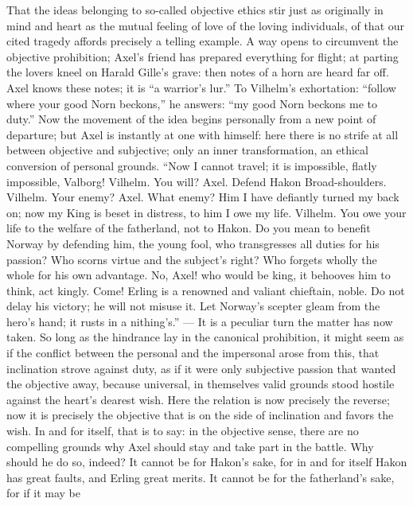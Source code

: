 \documentclass[12pt,a4paper,openany]{book}
\newcommand{\opage}[1]{\marginnote{\footnotesize\textit{[#1]}}}
\begin{document}
That the ideas belonging to so-called objective ethics
stir just as originally in mind and heart as
the mutual feeling of love of the loving individuals, of that
our cited tragedy affords precisely a telling
example. A way opens to circumvent the objective prohibition;
Axel's friend has prepared everything for flight;
at parting the lovers kneel on Harald Gille's grave:
then notes of a horn are heard far off. Axel knows
these notes; it is ``a warrior's lur.'' To Vilhelm's exhortation:
``follow where your good Norn beckons,'' he answers:
``my good Norn beckons me to duty.'' Now the movement of the idea
begins personally from a new point of departure;
\setcounter{footnote}{0}%
\opage{599}but Axel is instantly at one with himself: here there is no
strife at all between objective and subjective; only an
inner transformation, an ethical conversion of personal
grounds. ``Now I cannot travel; it is impossible, flatly
impossible, Valborg! Vilhelm. You will? Axel. Defend
Hakon Broad-shoulders. Vilhelm. Your enemy? Axel.
What enemy? Him I have defiantly turned my back on;
now my King is beset in distress, to him I owe my
life. Vilhelm. You owe your life to the welfare of the fatherland, not to
Hakon. Do you mean to benefit Norway by defending him,
the young fool, who transgresses all duties for his passion?
Who scorns virtue and the subject's right?
Who forgets wholly the whole for his own advantage. No,
Axel! who would be king, it behooves him to think,
act kingly. Come! Erling is a renowned and valiant
chieftain, noble. Do not delay his victory; he will not
misuse it. Let Norway's scepter gleam from the hero's
hand; it rusts in a nithing's.'' --- It is a peculiar
turn the matter has now taken. So long as the hindrance lay in
the canonical prohibition, it might seem as if the conflict
between the personal and the impersonal arose
from this, that inclination strove against duty, as if
it were only subjective passion that wanted the objective
away, because universal, in themselves valid grounds stood hostile
against the heart's dearest wish. Here the relation is now
precisely the reverse; now it is precisely the objective
that is on the side of inclination and favors
the wish. In and for itself, that is to say: in the objective sense, there
are no compelling grounds why Axel should stay and
take part in the battle. Why should he do so, indeed?
It cannot be for Hakon's sake, for in and for itself
\setcounter{footnote}{0}%
\opage{600}Hakon has great faults, and Erling great merits. It cannot
be for the fatherland's sake, for if it may be
\end{document}
